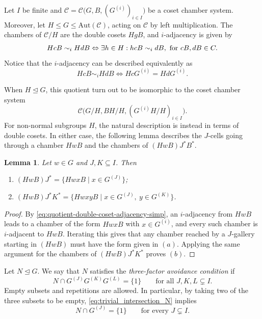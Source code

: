 \documentclass[10pt,a4paper]{amsart}
\newtheorem{lemma}[prop]{Lemma}
\newcommand{\CC}{\mathcal{C}}
\newcommand{\Aut}{\mathrm{Aut}}
\begin{document}
Let $I$ be finite and $\CC=\CC\bigl(G,B,(G^{(i)})_{i\in I}\bigr)$ be a coset chamber system. Moreover, let $H\leq G\leq \Aut(\CC)$, acting on $\CC$ by left multiplication.  The chambers of
$\CC/H$ are the double cosets $HgB$, and $i$-adjacency is given by\begin{equation*}
HcB \sim_i HdB \Leftrightarrow \exists h\in H: hcB \sim_i dB,\ \textnormal{for }cB,dB\in C.\end{equation*}
Notice that the $i$-adjacency can be described equivalently as 
\begin{equation}
\label{eq:quotient-double-coset-adjacency-simp}HcB \sim_i HdB \Longleftrightarrow HcG^{(i)}=HdG^{(i)}.
\end{equation}

When $H\trianglelefteq G$, this quotient turn out to be isomorphic to the coset chamber system
\[\CC\bigl(G/H,BH/H,(G^{(i)}H/H)_{i\in I}\bigr).\]
For non-normal subgroups $H$, the natural description is instead in terms of double cosets. In either case, the following lemma describes the $J$-cells going through a chamber $HwB$ and the chambers of $(HwB)J^*B^*$.


\begin{lemma}
\label{lem:quotient-cell-description}
Let $w\in G$ and $J,K\subseteq I$.  Then
\begin{enumerate}
    \item $(HwB)J^* =\{HwxB\mid x\in G^{(J)}\}$;
    \item $(HwB)J^*K^* =\{HwxyB\mid x\in G^{(J)},\ y\in G^{(K)}\}$.
\end{enumerate}
\end{lemma}

\begin{proof}
By \eqref{eq:quotient-double-coset-adjacency-simp}, an $i$-adjacency from $HwB$
leads to a chamber of the form $HwxB$ with $x\in G^{(i)}$, and every such
chamber is $i$-adjacent to $HwB$.  Iterating this gives that any chamber reached by a $J$-gallery starting in $(HwB)$ must have the form given in $(a)$. Applying the same argument for the chambers of $(HwB)J^*K^*$ proves $(b)$.
\end{proof}

Let $N\trianglelefteq G$.  We say that $N$ satisfies the
\emph{three-factor avoidance condition} if
\begin{equation}
\label{eq:trivial_intersection_N}
    N\cap G^{(J)}G^{(K)}G^{(L)}=\{1\}
    \qquad\text{for all }J,K,L\subsetneq I.
\end{equation}
Empty subsets and repetitions are
allowed.  In particular, by taking two of the three subsets to be empty,
\eqref{eq:trivial_intersection_N} implies
\begin{equation}
\label{eq:one-factor-avoidance}
    N\cap G^{(J)}=\{1\}
    \qquad\text{for every }J\subsetneq I.
\end{equation}
\end{document}
